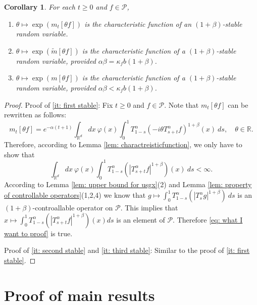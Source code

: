 \documentclass[12pt]{amsart}
\theoremstyle{plain}
\newtheorem{cor}[thm]{Corollary}
\theoremstyle{definition}
\numberwithin{equation}{section}
\begin{document}
\begin{cor}
\label{cor: alpha stable rv}
	For each $t\geq 0$ and $f\in \mathcal P$, 
\begin{enumerate}
\item 
\label{it: first stable}
    $\theta \mapsto \exp(m_t[\theta f])$ is the characteristic function of an $(1+\beta)$-stable random variable.
\item 
\label{it: second stable}
    $\theta \mapsto \exp(\tilde m[\theta f])$ is the characteristic function of a $(1+\beta)$-stable random variable, provided $\alpha\beta=\kappa_f b(1+\beta)$.
\item 
\label{it: third stable}
    $\theta \mapsto \exp(m[\theta f])$ is the characteristic function of a $(1+\beta)$-stable random variable, provided $\alpha\beta < \kappa_f b(1+\beta)$.
\end{enumerate}
\end{cor}
\begin{proof}
    Proof of \eqref{it: first stable}: 
	Fix $t\geq 0$ and $f\in \mathcal P$.
	Note that $m_t[\theta f]$ can be rewritten as follows:
\[
    m_t[\theta f]= e^{-\alpha (t+1)}\int_{\mathbb R^d} dx~\varphi(x)\int_0^1 T_{1-s}^\alpha (-i\theta T_{s+t}^\alpha f)^{1+\beta}(x)~ds,
    \quad \theta \in \mathbb R.
\]
	Therefore, according to Lemma \ref{lem: charactreisticfunction}, we only have to show that
\begin{equation}
\label{eq: what I want to proof}
	\int_{\mathbb R^d} dx~\varphi(x)\int_0^1 T_{1-s}^\alpha (|T_{s+t}^\alpha f|^{1+\beta})(x)~ds < \infty.
\end{equation}
	According to Lemma \ref{lem: upper bound for usgx}(2) and Lemma \ref{lem: property of controllable operators}(1,2,4) we know that
$
	g \mapsto \int_0^1 T_{1-s}^\alpha (|T_{s}^\alpha g|^{1+\beta})~ds
$
	is an $(1+\beta)$-controallable operator on $\mathcal P$.
	This implies that $x \mapsto \int_0^1 T_{1-s}^\alpha (|T_{s+t}^\alpha f|^{1+\beta})(x) ds$ is an element of $\mathcal P$.
	Therefore \eqref{eq: what I want to proof} is true.

    Proof of \eqref{it: second stable} and \eqref{it: third stable}: Similar to the proof of \eqref{it: first stable}.
\end{proof}


\section{Proof of main results}
\end{document}
